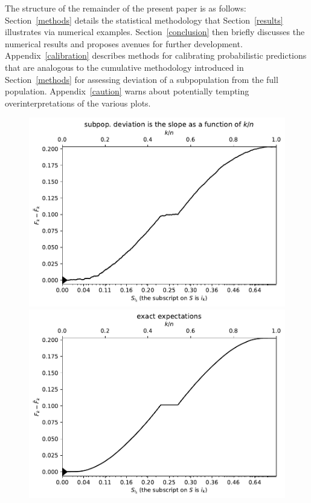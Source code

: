 \documentclass{article}
\begin{document}
The structure of the remainder of the present paper is as follows:
Section~\ref{methods} details the statistical methodology
that Section~\ref{results} illustrates via numerical examples.
Section~\ref{conclusion} then briefly discusses the numerical results
and proposes avenues for further development.
Appendix~\ref{calibration} describes methods
for calibrating probabilistic predictions that are analogous
to the cumulative methodology introduced in Section~\ref{methods}
for assessing deviation of a subpopulation from the full population.
Appendix~\ref{caution} warns about potentially tempting overinterpretations
of the various plots.


\newlength{\vertsep}
\setlength{\vertsep}{.085in}
\newlength{\imsize}
\setlength{\imsize}{.365\textwidth}


\begin{figure}
\begin{centering}

\parbox{\imsize}{\includegraphics[width=\imsize]
                 {./codes/unweighted/50000_5000_10_0/cumulative.pdf}}
\quad\quad
\parbox{\imsize}{\includegraphics[width=\imsize]
                 {./codes/unweighted/50000_5000_10_0/cumulative_exact.pdf}}


\end{centering}
\end{figure}
\end{document}
